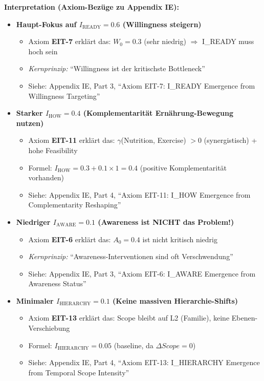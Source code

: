 \textbf{Interpretation (Axiom-Bezüge zu Appendix IE):}
\begin{itemize}[nosep]
\item \textbf{Haupt-Fokus auf $I_{\text{READY}} = 0.6$ (Willingness steigern)}
  \begin{itemize}[nosep]
  \item Axiom \textbf{EIT-7} erklärt das: $W_0 = 0.3$ (sehr niedrig) $\Rightarrow$ I_READY muss hoch sein
  \item \textit{Kernprinzip:} ``Willingness ist der kritischste Bottleneck''
  \item Siehe: Appendix IE, Part 3, ``Axiom EIT-7: I_READY Emergence from Willingness Targeting''
  \end{itemize}

\item \textbf{Starker $I_{\text{HOW}} = 0.4$ (Komplementarit\"{a}t Ern\"{a}hrung-Bewegung nutzen)}
  \begin{itemize}[nosep]
  \item Axiom \textbf{EIT-11} erklärt das: $\gamma$(Nutrition, Exercise) $> 0$ (synergistisch) + hohe Feasibility
  \item Formel: $I_{\text{HOW}} = 0.3 + 0.1 \times 1 = 0.4$ (positive Komplementarität vorhanden)
  \item Siehe: Appendix IE, Part 4, ``Axiom EIT-11: I_HOW Emergence from Complementarity Reshaping''
  \end{itemize}

\item \textbf{Niedriger $I_{\text{AWARE}} = 0.1$ (Awareness ist \textbf{NICHT} das Problem!)}
  \begin{itemize}[nosep]
  \item Axiom \textbf{EIT-6} erklärt das: $A_0 = 0.4$ ist nicht kritisch niedrig
  \item \textit{Kernprinzip:} ``Awareness-Interventionen sind oft Verschwendung''
  \item Siehe: Appendix IE, Part 3, ``Axiom EIT-6: I_AWARE Emergence from Awareness Status''
  \end{itemize}

\item \textbf{Minimaler $I_{\text{HIERARCHY}} = 0.1$ (Keine massiven Hierarchie-Shifts)}
  \begin{itemize}[nosep]
  \item Axiom \textbf{EIT-13} erklärt das: Scope bleibt auf L2 (Familie), keine Ebenen-Verschiebung
  \item Formel: $I_{\text{HIERARCHY}} = 0.05$ (baseline, da $\Delta Scope = 0$)
  \item Siehe: Appendix IE, Part 4, ``Axiom EIT-13: I_HIERARCHY Emergence from Temporal Scope Intensity''
  \end{itemize}
\end{itemize}

